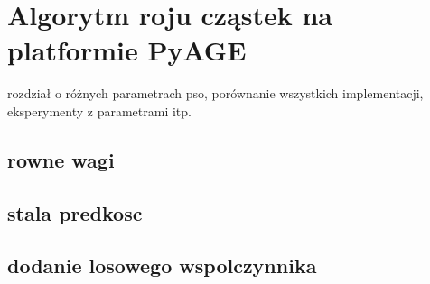 \chapter{Algorytm roju cząstek na platformie PyAGE}
\label{cha:psoTesty}



rozdział o różnych parametrach pso, porównanie wszystkich implementacji, eksperymenty z parametrami itp.

\section{rowne wagi}
\section{stala predkosc}
\section{dodanie losowego wspolczynnika}







